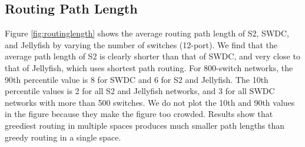 \documentclass[10pt,conference]{IEEEtran}
\begin{document}
\subsection{Routing Path Length}
Figure \ref{fig:routinglength} shows the average routing path length of S2, SWDC, and Jellyfish by varying the number of switches (12-port). We find that the average path length of S2 is clearly shorter than that of SWDC, and very close to that of Jellyfish, which uses shortest path routing.  For 800-switch networks, the 90th percentile value is 8 for SWDC and 6 for S2 and Jellyfish. The 10th percentile values is 2 for all  S2 and Jellyfish networks, and 3 for all SWDC networks with more than 500 switches. We do not plot the 10th and 90th values in the figure because they make the figure too crowded. Results show that greediest routing in multiple spaces produces much smaller path lengths than greedy routing in a single space.


\iffalse
\subsection{Key-based routing}
For the performance of key-based routing, we measure routing path lengths, which reflect the store/retrieval latency, and balance of key-value load among switches.

Figure \ref{fig:keylength} shows the average key-based routing path length of S2 and SWDC. Each value is the average path length of 100,000 different keys. Each  data record is stored in 3-replication for both S2 and SWDC experiments. We find that S2 has significantly shorter routing paths, which also grow more slowly with the increase of network size compared to the SWDC paths. Figure \ref{fig:keybalance} shows the number of key-value stores per switch (we assume the switch-to-server key mapping is balanced). Since SWDC uses uniform node coordinates, it can achieve near-perfect load balance. If S2 only uses coordinates in one space, the key-values stores are very biased. However, when S2 applies replication in three spaces, key-value storage load distribution is almost as uniform as that of SWDC.
\fi
\iffalse
\begin{figure}[h]
\centering
\texttt{[image: fig/routing/routingFailLength.eps]}
\vspace{-1.5ex}
\caption{\small Average routing path length versus failure fraction}
\label{fig:routingFailLength}
\vspace{-3.5ex}
\end{figure}
\fi
\end{document}
